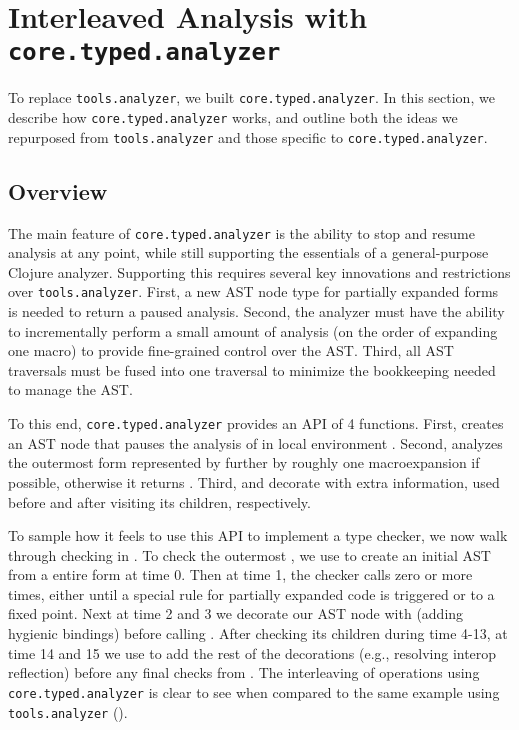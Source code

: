 \section{Interleaved Analysis with \texttt{core.typed.analyzer}}

To replace \texttt{tools.analyzer}, we built \texttt{core.typed.analyzer}. In this section,
we describe how \texttt{core.typed.analyzer} works, and outline both the ideas we repurposed
from \texttt{tools.analyzer} and those specific to \texttt{core.typed.analyzer}.

\subsection{Overview}

The main feature of \texttt{core.typed.analyzer} is the ability to stop and resume
analysis at any point, while still supporting the essentials of a general-purpose Clojure analyzer.
Supporting this requires several key innovations and restrictions over \texttt{tools.analyzer}.
First, a new AST node type for partially expanded forms is needed to return a paused analysis.
Second, the analyzer must have the ability to incrementally perform a small amount of analysis
(on the order of expanding one macro) to provide fine-grained control over the AST.
Third, all AST traversals must be fused into one traversal to minimize
the bookkeeping needed to manage the AST.

To this end, \texttt{core.typed.analyzer} provides an API of 4 functions.
First,  creates an  AST node
that pauses the analysis of  in local environment .
Second,  analyzes the outermost form represented by 
further by roughly one macroexpansion if possible, otherwise it returns .
Third,  and 
decorate  with extra information, used before and after visiting its children,
respectively.

To sample how it feels to use this API to implement a type checker, we now
walk through checking  in .
To check the outermost ,
we use  to create an initial AST from a entire form at time 0.
Then at time 1, the checker calls  zero or more times, either 
until a special rule for partially expanded code is triggered
or to a fixed point.
Next at time 2 and 3 we decorate our AST node with  (adding hygienic bindings)
before calling .
After checking its children during time 4-13, at time 14 and 15 we use 
to add the rest of the decorations (e.g., resolving interop reflection)
before any final checks from .
The interleaving of operations using \texttt{core.typed.analyzer} is clear to see when
compared to the same example using \texttt{tools.analyzer} 
().

